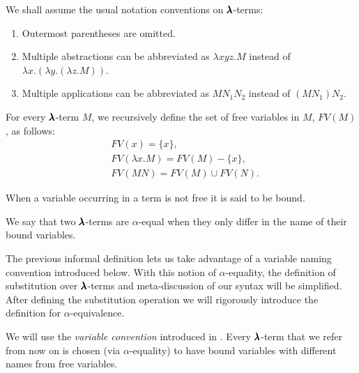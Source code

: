 \begin{notation}
  We shall assume the usual notation conventions on $\pmb{\lambda}$-terms:

  \begin{enumerate}
  \item Outermost parentheses are omitted.
  \item Multiple abstractions can be abbreviated as $\lambda x y z . M$ instead of  $\lambda x . (\lambda y . (\lambda z . M))$.
  \item Multiple applications can be abbreviated as $M N_1 N_2$ instead of $(M N_1) N_2$.
  \end{enumerate}
\end{notation}

\begin{definition}
  For every $\pmb{\lambda}$-term $M$, we recursively define the set of free variables in $M$, $FV(M)$, as follows:  
  \begin{align*}
    & FV( x ) = \{ x \}, \\
    & FV( \lambda x . M ) = FV(M) - \{ x \}, \\
    & FV( M N ) = FV(M) \cup FV(N).
  \end{align*}

  When a variable occurring in a term is not free it is said to be bound.
\end{definition}

\begin{definition}
  We say that two $\pmb{\lambda}$-terms are $\alpha$-equal when they only differ in the name of their bound variables.
\end{definition}

\begin{remark}
  The previous informal definition lets us take advantage of a variable naming convention introduced below.
  With this notion of $\alpha$-equality, the definition of substitution over $\pmb{\lambda}$-terms and meta-discussion of our syntax will be simplified.
  After defining the substitution operation we will rigorously introduce the definition for $\alpha$-equivalence.
\end{remark}

\begin{convention} 
  We will use the \textit{variable convention} introduced in \cite{Barendregt1987}.
  Every $\pmb{\lambda}$-term that we refer from now on is chosen (via $\alpha$-equality) to have bound variables with different names from free variables.
\end{convention}

